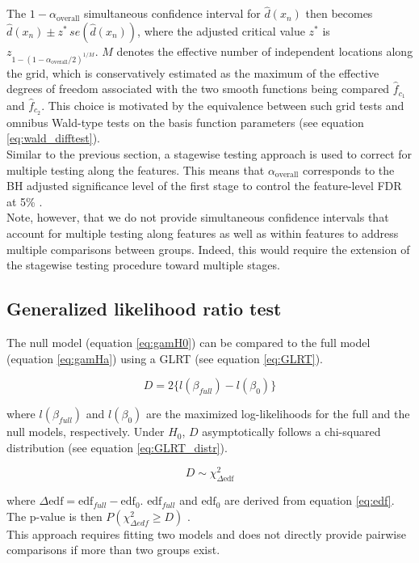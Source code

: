 The $1-\alpha_{\text{overall}}$ simultaneous confidence interval for $\hat{d}(x_n)$ then becomes $\hat{d}(x_n) \pm  z^*\,se(\hat{d}(x_n))$, where the adjusted critical value $z^*$ is $z_{1-{(1-\alpha_{\text{overall}}/2)}^{1/M}}$.
$M$ denotes the effective number of independent locations along the grid, which is conservatively estimated as the maximum of the effective degrees of freedom associated with the two smooth functions being compared $\hat{f}_{c_1}$ and $\hat{f}_{c_2}$. This choice is motivated by the equivalence between such grid tests and omnibus Wald-type tests on the basis function parameters (see equation \ref{eq:wald_difftest}).\\

Similar to the previous section, a stagewise testing approach is used to correct for multiple testing along the features. This means that $\alpha_{\text{overall}}$ corresponds to the BH adjusted significance level of the first stage to control the feature-level FDR at 5\% \cite{stagewise_testing}.\\
Note, however, that we do not provide simultaneous confidence intervals that account for multiple testing along features as well as within features to address multiple comparisons between groups. Indeed, this would require the extension of the stagewise testing procedure toward multiple stages.

\subsection{Generalized likelihood ratio test} \label{suppl_glrt}

The null model (equation \ref{eq:gamH0}) can be compared to the full model (equation \ref{eq:gamHa}) using a GLRT (see equation \ref{eq:GLRT}).

\begin{equation}
    D = 2\{l(\beta_{full}) - l(\beta_{0})\}
    \label{eq:GLRT}
\end{equation}

where $l(\beta_{full})$ and $l(\beta_{0})$ are the maximized log-likelihoods for the full and the null models, respectively. Under $H_0$, $D$ asymptotically follows a chi-squared distribution (see equation \ref{eq:GLRT_distr}).

\begin{equation}
    D \sim  \chi^{2}_{\Delta \text{edf}}
    \label{eq:GLRT_distr}
\end{equation}

where $\Delta \text{edf} = \text{edf}_{full} - \text{edf}_0$. $\text{edf}_{full}$ and $\text{edf}_0$ are derived from equation \ref{eq:edf}. The p-value is then $P(\chi^2_{\Delta edf} \geq D)$ \cite{gambook_gamtheory_glrt}.\\

This approach requires fitting two models and does not directly provide pairwise comparisons if more than two groups exist.
